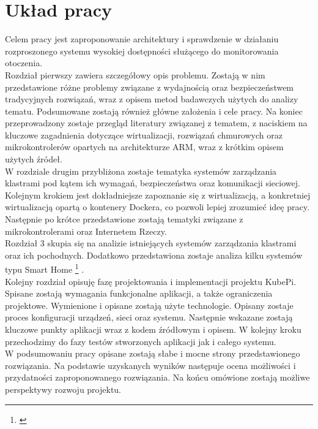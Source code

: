 \documentclass[12pt]{report}
\let\Oldsection\section
\renewcommand{\section}{\FloatBarrier\Oldsection}
\begin{document}
\section{Układ pracy}
Celem pracy jest zaproponowanie architektury i sprawdzenie w działaniu rozproszonego systemu wysokiej dostępności służącego do monitorowania otoczenia. \\
\indent Rozdział pierwszy zawiera szczegółowy opis problemu. Zostają w nim przedstawione różne problemy związane z wydajnością oraz bezpieczeństwem tradycyjnych rozwiązań, wraz z opisem metod badawczych użytych do analizy tematu. Podsumowane zostają również główne założenia i cele pracy. Na koniec przeprowadzony zostaje przegląd literatury związanej z tematem, z naciskiem na kluczowe zagadnienia dotyczące wirtualizacji, rozwiązań chmurowych oraz mikrokontrolerów opartych na architekturze ARM, wraz z krótkim opisem użytych źródeł. \\
\indent W rozdziale drugim przybliżona zostaje tematyka systemów zarządzania klastrami pod kątem ich wymagań, bezpieczeństwa oraz komunikacji sieciowej. Kolejnym krokiem jest dokładniejsze zapoznanie się z wirtualizacją, a konkretniej wirtualizacją opartą o kontenery Dockera, co pozwoli lepiej zrozumieć ideę pracy. Następnie po krótce przedstawione zostają tematyki związane z mikrokontrolerami oraz Internetem Rzeczy. \\
\indent Rozdział 3 skupia się na analizie istniejących systemów zarządzania klastrami oraz ich pochodnych. Dodatkowo przedstawiona zostaje analiza kilku systemów typu Smart Home
\footnote{\cite{smarthome}}
. \\
\indent Kolejny rozdział opisuję fazę projektowania i implementacji projektu KubePi. Spisane zostają wymagania funkcjonalne aplikacji, a także ograniczenia projektowe. Wymienione i opisane zostają użyte technologie. Opisany zostaje proces konfiguracji urządzeń, sieci oraz systemu. Następnie wskazane zostają kluczowe punkty aplikacji wraz z kodem źródłowym i opisem. W kolejny kroku przechodzimy do fazy testów stworzonych aplikacji jak i całego systemu. \\
\indent W podsumowaniu pracy opisane zostają słabe i mocne strony przedstawionego rozwiązania. Na podstawie uzyskanych wyników następuje ocena możliwości i przydatności zaproponowanego rozwiązania. Na końcu omówione zostają możliwe perspektywy rozwoju projektu.
\end{document}
